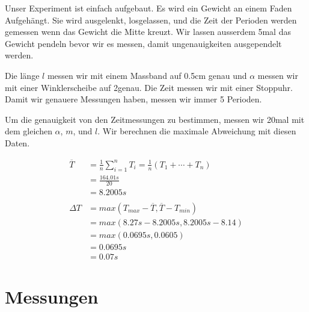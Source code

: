 \documentclass[12pt, a4paper, twoside]{article}
\begin{document}
Unser Experiment ist einfach aufgebaut.
Es wird ein Gewicht an einem Faden Aufgehängt.
Sie wird ausgelenkt, losgelassen, und die Zeit der Perioden werden gemessen wenn das Gewicht die Mitte kreuzt.
Wir lassen ausserdem 5mal das Gewicht pendeln bevor wir es messen, damit ungenauigkeiten ausgependelt werden.

Die länge $l$ messen wir mit einem Massband auf 0.5cm genau und $\alpha$ messen wir mit einer Winklerscheibe auf 2\textdegree genau.
Die Zeit messen wir mit einer Stoppuhr. Damit wir genauere Messungen haben, messen wir immer 5 Perioden.

Um die genauigkeit von den Zeitmessungen zu bestimmen, messen wir 20mal mit dem gleichen $\alpha$, $m$, und $l$.
Wir berechnen die maximale Abweichung mit diesen Daten.



\begin{align*}
  \overline{T} & = \frac{1}{n} \sum_{i=1}^{n} T_{i}=\frac{1}{n}\left(T_{1}+\cdots+T_{n}\right) \\
               & =\frac{164.01s}{20}                                                           \\
               & =8.2005s                                                                      \\
  \\
  \Delta T     & = max(T_{max} - \overline{T}, \overline{T} - T_{min})                         \\
               & = max(8.27s - 8.2005s, 8.2005s - 8.14)                                        \\
               & = max(0.0695s, 0.0605)                                                        \\
               & = 0.0695s                                                                     \\
               & = 0.07s
\end{align*}

\vfill\pagebreak

\section{Messungen}
\end{document}
